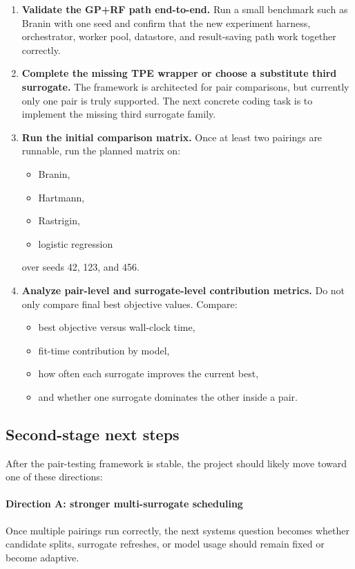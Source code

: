 \documentclass[11pt]{article}
\begin{document}
\begin{enumerate}[leftmargin=1.5em]
    \item \textbf{Validate the GP+RF path end-to-end.}
    Run a small benchmark such as Branin with one seed and confirm that the new experiment harness, orchestrator, worker pool, datastore, and result-saving path work together correctly.

    \item \textbf{Complete the missing TPE wrapper or choose a substitute third surrogate.}
    The framework is architected for pair comparisons, but currently only one pair is truly supported. The next concrete coding task is to implement the missing third surrogate family.

    \item \textbf{Run the initial comparison matrix.}
    Once at least two pairings are runnable, run the planned matrix on:
    \begin{itemize}[leftmargin=1.5em]
        \item Branin,
        \item Hartmann,
        \item Rastrigin,
        \item logistic regression
    \end{itemize}
    over seeds 42, 123, and 456.

    \item \textbf{Analyze pair-level and surrogate-level contribution metrics.}
    Do not only compare final best objective values. Compare:
    \begin{itemize}[leftmargin=1.5em]
        \item best objective versus wall-clock time,
        \item fit-time contribution by model,
        \item how often each surrogate improves the current best,
        \item and whether one surrogate dominates the other inside a pair.
    \end{itemize}
\end{enumerate}

\subsection{Second-stage next steps}

After the pair-testing framework is stable, the project should likely move toward one of these directions:

\paragraph{Direction A: stronger multi-surrogate scheduling}
Once multiple pairings run correctly, the next systems question becomes whether candidate splits, surrogate refreshes, or model usage should remain fixed or become adaptive.
\end{document}
